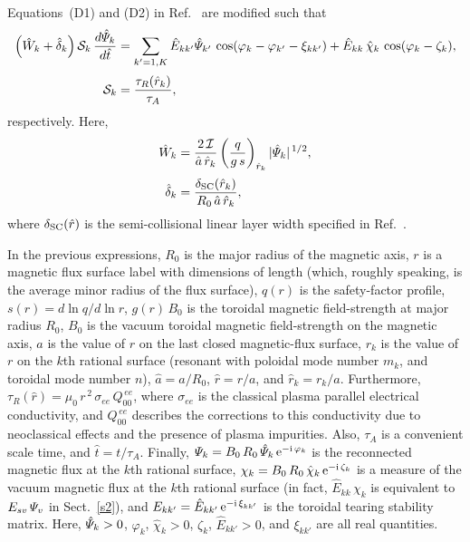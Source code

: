 \documentclass[12pt,prb,aps]{revtex4-1}
\begin{document}
Equations~(D1) and (D2) in Ref.~ are modified such that 
\begin{align}\label{e15}
\left(\hat{W}_k + \hat{\delta}_k\right){\cal S}_k\,\frac{d\hat{\mit\Psi}_k}{d\hat{t}} &= \sum_{k'=1,K}\hat{E}_{kk'}\hat{\mit\Psi}_{k'}\,\cos(\varphi_k-\varphi_{k'}-\xi_{kk'})
+\hat{E}_{kk}\,\hat{\chi}_k\,\cos(\varphi_k-\zeta_k),\\[0.5ex]
{\cal S}_k&=\frac{\tau_R(\hat{r}_k)}{\tau_A},
\end{align}
respectively. Here, 
\begin{align}
\hat{W}_k &=\frac{2\,{\cal I}}{\hat{a}\,\hat{r}_k}\left(\frac{q}{g\,s}\right)_{\hat{r}_k} |\hat{\mit\Psi}_k|^{\,1/2},\\[0.5ex]
\hat{\delta}_k &= \frac{\delta_{\rm SC}(\hat{r}_k)}{R_0\,\hat{a}\,\hat{r}_k},
\end{align}
where $\delta_{\rm SC}(\hat{r})$ is the semi-collisional linear layer width specified in Ref.~.

In the previous expressions, $R_0$ is the major radius of the magnetic axis, $r$ is a magnetic flux surface label with dimensions of length (which, roughly speaking, is the average minor radius of the
flux surface), $q(r)$ is the safety-factor profile, $s(r)=d\ln q/d\ln r$, 
$g(r)\,B_0$ is the toroidal magnetic field-strength at major radius $R_0$, $B_0$ is the vacuum
toroidal magnetic field-strength on the magnetic axis, $a$ is the value of $r$ on the last closed magnetic-flux surface, $r_k$ is the value of $r$ on the $k$th rational
surface (resonant with poloidal mode number $m_k$, and toroidal mode number $n$), $\hat{a}=a/R_0$, $\hat{r}=r/a$, and $\hat{r}_k=r_k/a$. 
Furthermore, $\tau_R(\hat{r})= \mu_0\,r^{\,2}\,\sigma_{ee}\,Q_{00}^{\,ee}$, where $\sigma_{ee}$ is the classical plasma parallel electrical conductivity, and
$Q_{00}^{\,ee}$ describes the corrections to this conductivity due to neoclassical effects and the presence of plasma impurities. Also, $\tau_A$ is a convenient
scale time, and $\hat{t}=t/\tau_A$. Finally, ${\mit\Psi}_k = B_0\,R_0\,\hat{\mit\Psi}_k\,{\rm e}^{-{\rm i}\,\varphi_k}$ is the reconnected magnetic flux
at the $k$th rational surface, ${\mit\chi}_k = B_0\,R_0\,\hat{\mit\chi}_k\,{\rm e}^{-{\rm i}\,\zeta_k}$ is a measure of the vacuum magnetic flux at the $k$th
rational surface (in fact, $\hat{E}_{kk}\,\chi_k$ is equivalent to $E_{sv}\,{\mit\Psi}_v$ in Sect.~\ref{s2}), and $E_{kk'} =\hat{E}_{kk'}\,{\rm e}^{-{\rm i}\,\xi_{kk'}}$ is the toroidal tearing stability matrix.\cite{am1} Here, $\hat{\mit\Psi}_k>0$, $\varphi_k$, $\hat{\chi}_k>0$,
$\zeta_k$, $\hat{E}_{kk'}>0$, and $\xi_{kk'}$ are all real quantities.
\end{document}
